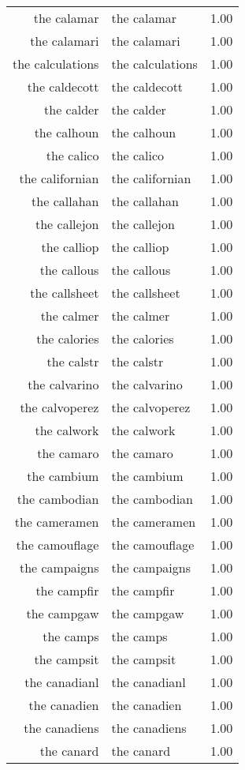 \begin{table}[ht]
\begin{tabular}{rlr}
  the calamar & the calamar & 1.00 \\ 
  the calamari & the calamari & 1.00 \\ 
  the calculations & the calculations & 1.00 \\ 
  the caldecott & the caldecott & 1.00 \\ 
  the calder & the calder & 1.00 \\ 
  the calhoun & the calhoun & 1.00 \\ 
  the calico & the calico & 1.00 \\ 
  the californian & the californian & 1.00 \\ 
  the callahan & the callahan & 1.00 \\ 
  the callejon & the callejon & 1.00 \\ 
  the calliop & the calliop & 1.00 \\ 
  the callous & the callous & 1.00 \\ 
  the callsheet & the callsheet & 1.00 \\ 
  the calmer & the calmer & 1.00 \\ 
  the calories & the calories & 1.00 \\ 
  the calstr & the calstr & 1.00 \\ 
  the calvarino & the calvarino & 1.00 \\ 
  the calvoperez & the calvoperez & 1.00 \\ 
  the calwork & the calwork & 1.00 \\ 
  the camaro & the camaro & 1.00 \\ 
  the cambium & the cambium & 1.00 \\ 
  the cambodian & the cambodian & 1.00 \\ 
  the cameramen & the cameramen & 1.00 \\ 
  the camouflage & the camouflage & 1.00 \\ 
  the campaigns & the campaigns & 1.00 \\ 
  the campfir & the campfir & 1.00 \\ 
  the campgaw & the campgaw & 1.00 \\ 
  the camps & the camps & 1.00 \\ 
  the campsit & the campsit & 1.00 \\ 
  the canadianl & the canadianl & 1.00 \\ 
  the canadien & the canadien & 1.00 \\ 
  the canadiens & the canadiens & 1.00 \\ 
  the canard & the canard & 1.00 \\ 

\end{tabular}
\end{table}
